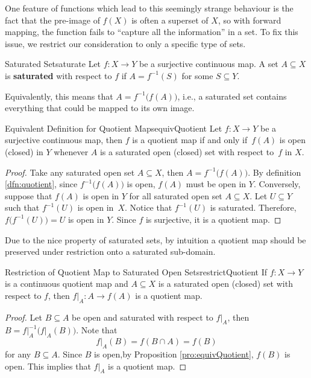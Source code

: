 \documentclass[math]{amznotes}
\theoremstyle{remark}
\begin{document}
One feature of functions which lead to this seemingly strange behaviour is the fact that the pre-image of $f\left(X\right)$ is often a superset of $X$, so with forward mapping, the function fails to ``capture all the information'' in a set. To fix this issue, we restrict our consideration to only a specific type of sets.
\begin{dfnbox}{Saturated Set}{saturate}
    Let $f \colon X \to Y$ be a surjective continuous map. A set $A \subseteq X$ is {\color{red} \textbf{saturated}} with respect to $f$ if $A = f^{-1}\left(S\right)$ for some $S \subseteq Y$.
\end{dfnbox}
Equivalently, this means that $A = f^{-1}\bigl(f\left(A\right)\bigr)$, i.e., a saturated set contains everything that could be mapped to its own image.
\begin{probox}{Equivalent Definition for Quotient Maps}{equivQuotient}
    Let $f \colon X \to Y$ be a surjective continuous map, then $f$ is a quotient map if and only if~$f\left(A\right)$ is open (closed) in $Y$ whenever $A$ is a saturated open (closed) set with respect to~$f$ in $X$.
    \tcblower
    \begin{proof}
        Take any saturated open set $A \subseteq X$, then $A = f^{-1}\bigl(f\left(A\right)\bigr)$. By definition \ref{dfn:quotient}, since $f^{-1}\bigl(f\left(A\right)\bigr)$ is open, $f\left(A\right)$ must be open in $Y$. Conversely, suppose that $f\left(A\right)$ is open in $Y$ for all saturated open set $A \subseteq X$. Let $U \subseteq Y$ such that $f^{-1}\left(U\right)$ is open in~$X$. Notice that $f^{-1}\left(U\right)$ is saturated. Therefore, $f\bigl(f^{-1}\left(U\right)\bigr) = U$ is open in $Y$. Since $f$ is surjective, it is a quotient map.
    \end{proof}
\end{probox}
Due to the nice property of saturated sets, by intuition a quotient map should be preserved under restriction onto a saturated sub-domain.
\begin{probox}{Restriction of Quotient Map to Saturated Open Sets}{restrictQuotient}
    If $f \colon X \to Y$ is a continuous quotient map and $A \subseteq X$ is a saturated open (closed) set with respect to $f$, then $\left.f\right\rvert_A \colon A \to f\left(A\right)$ is a quotient map.
    \tcblower
    \begin{proof}
        Let $B \subseteq A$ be open and saturated with respect to $\left.f\right\rvert_A$, then $B = \left.f\right\rvert_A^{-1}\bigl(\left.f\right\rvert_A\left(B\right)\bigr)$. Note that 
        \begin{equation*}
            \left.f\right\rvert_A\left(B\right) = f\left(B \cap A\right) = f\left(B\right)
        \end{equation*}
        for any $B \subseteq A$. Since $B$ is open,by Proposition \ref{pro:equivQuotient}, $f\left(B\right)$ is open. This implies that $\left.f\right\rvert_A$ is a quotient map.
    \end{proof}
\end{probox}
\end{document}
